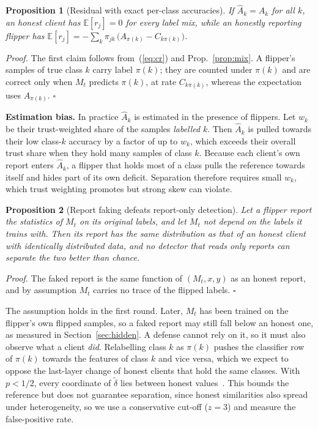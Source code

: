 \documentclass[conference]{IEEEtran}
\newtheorem{proposition}{Proposition}
\begin{document}
\begin{proposition}[Residual with exact per-class accuracies]\label{prop:cr}
If $\hat A_k=A_k$ for all $k$, an honest client has $\mathbb{E}[r_j]=0$ for every label mix, while an honestly reporting flipper has $\mathbb{E}[r_j]=-\sum_k\pi_{jk}\,\big(A_{\pi(k)}-C_{k\pi(k)}\big)$.
\end{proposition}
\emph{Proof.} The first claim follows from~(\ref{eq:cr}) and Prop.~\ref{prop:mix}. A flipper's samples of true class $k$ carry label $\pi(k)$; they are counted under $\pi(k)$ and are correct only when $M_t$ predicts $\pi(k)$, at rate $C_{k\pi(k)}$, whereas the expectation uses $A_{\pi(k)}$. \hfill$\square$

\textbf{Estimation bias.} In practice $\hat A_k$ is estimated in the presence of flippers. Let $w_k$ be their trust-weighted share of the samples \emph{labelled} $k$. Then $\hat A_k$ is pulled towards their low class-$k$ accuracy by a factor of up to $w_k$, which exceeds their overall trust share when they hold many samples of class $k$. Because each client's own report enters $\hat A_k$, a flipper that holds most of a class pulls the reference towards itself and hides part of its own deficit. Separation therefore requires small $w_k$, which trust weighting promotes but strong skew can violate.

\begin{proposition}[Report faking defeats report-only detection]\label{prop:faking}
Let a flipper report the statistics of $M_t$ on its original labels, and let $M_t$ not depend on the labels it trains with. Then its report has the same distribution as that of an honest client with identically distributed data, and no detector that reads only reports can separate the two better than chance.
\end{proposition}
\emph{Proof.} The faked report is the same function of $(M_t,x,y)$ as an honest report, and by assumption $M_t$ carries no trace of the flipped labels. \hfill$\square$

The assumption holds in the first round. Later, $M_t$ has been trained on the flipper's own flipped samples, so a faked report may still fall below an honest one, as measured in Section~\ref{sec:hidden}. A defense cannot rely on it, so it must also observe what a client \emph{did}. Relabelling class $k$ as $\pi(k)$ pushes the classifier row of $\pi(k)$ towards the features of class $k$ and vice versa, which we expect to oppose the last-layer change of honest clients that hold the same classes. With $p<1/2$, every coordinate of $\tilde\delta$ lies between honest values~\cite{yin2018byzantine}. This bounds the reference but does not guarantee separation, since honest similarities also spread under heterogeneity, so we use a conservative cut-off ($z{=}3$) and measure the false-positive rate.
\end{document}
